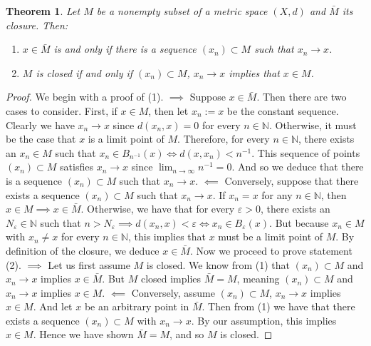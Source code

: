 \documentclass[11pt]{article}
\theoremstyle{mystyle}
\newtheorem{thm}{Theorem}[section]
\newcommand{\0}{\mathbf{0}}
\begin{document}
\begin{thm}\label{closedconvergent}
Let $M$ be a nonempty subset of a metric space $(X,d)$ and $\bar{M}$ its closure. Then:
\begin{enumerate}
    \item $x \in \bar{M}$ is and only if there is a sequence $(x_n) \subset M$ such that $x_n \longrightarrow x$.
    \item $M$ is closed if and only if $(x_n) \subset M$, $x_n \longrightarrow x$ implies that $x \in M$.
\end{enumerate}
\end{thm}
\begin{proof}
We begin with a proof of (1).\newline
$\implies$ Suppose $x \in \bar{M}$. Then there are two cases to consider. First, if $x \in M$, then let $x_n := x$ be the constant sequence. Clearly we have $x_n \longrightarrow x$ since $d(x_n, x) = 0$ for every $n \in \mathbb{N}$. Otherwise, it must be the case that $x$ is a limit point of $M$. Therefore, for every $n \in \mathbb{N}$, there exists an $x_n \in M$ such that $x_n \in B_{n^{-1}}(x) \iff d(x, x_n) < n^{-1}$. This sequence of points $(x_n) \subset M$ satisfies $x_n \longrightarrow x$ since $\lim_{n \to \infty} n^{-1} = 0$. And so we deduce that there is a sequence $(x_n) \subset M$ such that $x_n \longrightarrow x$.\newline
$\impliedby$ Conversely, suppose that there exists a sequence $(x_n) \subset M$ such that $x_n \longrightarrow x$. If $x_n = x$ for any $n \in \mathbb{N}$, then $x \in M \implies x \in \bar{M}$. Otherwise, we have that for every $\varepsilon > 0$, there exists an $N_{\varepsilon} \in \mathbb{N}$ such that $n > N_{\varepsilon} \implies d(x_n, x) <\varepsilon \iff x_n \in B_{\varepsilon}(x)$. But because $x_n \in M$ with $x_n \neq x$ for every $n \in \mathbb{N}$, this implies that $x$ must be a limit point of $M$. By definition of the closure, we deduce $x \in \bar{M}$. \newline
Now we proceed to prove statement (2).\newline
$\implies$ Let us first assume $M$ is closed. We know from (1) that $(x_n) \subset M$ and $x_n \longrightarrow x$ implies $x \in \bar{M}$. But $M$ closed implies $\bar{M} = M$, meaning $(x_n) \subset M$ and $x_n \longrightarrow x$ implies $x \in M$.\newline
$\impliedby$ Conversely, assume $(x_n) \subset M$, $x_n \longrightarrow x$ implies $x \in M$. And let $x$ be an arbitrary point in $\bar{M}$. Then from (1) we have that there exists a sequence $(x_n) \subset M$ with $x_n \longrightarrow x$. By our assumption, this implies $x \in M$. Hence we have shown $\bar{M} = M$, and so $M$ is closed.
\end{proof}
\end{document}
